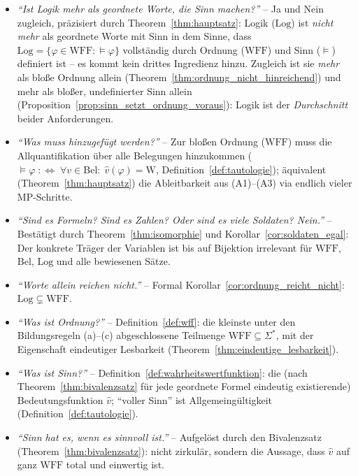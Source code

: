\documentclass[12pt, a4paper]{article}
\theoremstyle{definition}
\theoremstyle{remark}
\newcommand{\W}{\mathrm{W}}
\newcommand{\WFF}{\mathrm{WFF}}
\newcommand{\Log}{\mathrm{Log}}
\newcommand{\Bel}{\mathrm{Bel}}
\begin{document}
\begin{itemize}
  \item \emph{``Ist Logik mehr als geordnete Worte, die Sinn machen?''} -- Ja und Nein zugleich, präzisiert durch Theorem~\ref{thm:hauptsatz}: Logik ($\Log$) ist \emph{nicht mehr} als geordnete Worte mit Sinn in dem Sinne, dass $\Log = \{\varphi\in\WFF:\models\varphi\}$ vollständig durch Ordnung ($\WFF$) und Sinn ($\models$) definiert ist -- es kommt kein drittes Ingredienz hinzu. Zugleich ist sie \emph{mehr} als bloße Ordnung allein (Theorem~\ref{thm:ordnung_nicht_hinreichend}) und mehr als bloßer, undefinierter Sinn allein (Proposition~\ref{prop:sinn_setzt_ordnung_voraus}): Logik ist der \emph{Durchschnitt} beider Anforderungen.

  \item \emph{``Was muss hinzugefügt werden?''} -- Zur bloßen Ordnung ($\WFF$) muss die Allquantifikation über alle Belegungen hinzukommen ($\models\varphi \;:\Leftrightarrow\; \forall v\in\Bel:\; \hat v(\varphi)=\W$, Definition~\ref{def:tautologie}); äquivalent (Theorem~\ref{thm:hauptsatz}) die Ableitbarkeit aus (A1)--(A3) via endlich vieler MP-Schritte.

  \item \emph{``Sind es Formeln? Sind es Zahlen? Oder sind es viele Soldaten? Nein.''} -- Bestätigt durch Theorem~\ref{thm:isomorphie} und Korollar~\ref{cor:soldaten_egal}: Der konkrete Träger der Variablen ist bis auf Bijektion irrelevant für $\WFF$, $\Bel$, $\Log$ und alle bewiesenen Sätze.

  \item \emph{``Worte allein reichen nicht.''} -- Formal Korollar~\ref{cor:ordnung_reicht_nicht}: $\Log \subsetneq \WFF$.

  \item \emph{``Was ist Ordnung?''} -- Definition~\ref{def:wff}: die kleinste unter den Bildungsregeln (a)--(c) abgeschlossene Teilmenge $\WFF\subseteq\Sigma^\ast$, mit der Eigenschaft eindeutiger Lesbarkeit (Theorem~\ref{thm:eindeutige_lesbarkeit}).

  \item \emph{``Was ist Sinn?''} -- Definition~\ref{def:wahrheitswertfunktion}: die (nach Theorem~\ref{thm:bivalenzsatz} für jede geordnete Formel eindeutig existierende) Bedeutungsfunktion $\hat v$; ``voller Sinn'' ist Allgemeingültigkeit (Definition~\ref{def:tautologie}).

  \item \emph{``Sinn hat es, wenn es sinnvoll ist.''} -- Aufgelöst durch den Bivalenzsatz (Theorem~\ref{thm:bivalenzsatz}): nicht zirkulär, sondern die Aussage, dass $\hat v$ auf ganz $\WFF$ total und einwertig ist.


\end{itemize}
\end{document}
